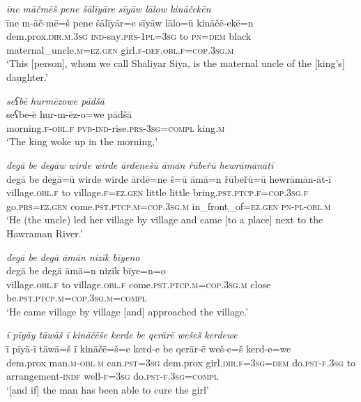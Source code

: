 \ea \label{ZP.36}
\textit{īne māčmēš pene šālīyāre sīyāw lālow kināčekēn} \\ 
\gll īne m-āč-mē=š pene šālīyār=e sīyāw lālo=ū kināčē-ekē=n \\ 
 dem.prox\textsc{.dir}\textsc{.m}\textsc{.3sg} \textsc{ind-}say\textsc{.prs}\textsc{-1pl}\textsc{=3sg} to \textsc{pn}\textsc{=dem} black maternal\_uncle\textsc{.m}\textsc{\textsc{=ez.gen}} girl\textsc{.f}\textsc{-def}\textsc{.obl}\textsc{.f}\textsc{=cop}\textsc{.3sg}\textsc{.m} \\ 
\glt `This [person], whom we call Shaliyar Siya, is the maternal uncle of the [king’s] daughter.'
\z 
 
\ea \label{ZP.37}
\textit{seʕbē hurmēzowe pādšā} \\ 
\gll seʕbe-ē hur-m-ēz-o=we pādšā \\ 
 morning\textsc{.f}\textsc{-obl}\textsc{.f} \textsc{pvb-}\textsc{ind-}rise\textsc{.prs}\textsc{-3sg}\textsc{=compl} king\textsc{.m} \\ 
\glt `The king woke up in the morning,'
\z 
 
\ea \label{ZP.41}
\textit{degā be degāw wirde wirde ārdēnešū āmān řūbeřū hewrāmānātī} \\ 
\gll degā be degā=ū wirde wirde ārdē=ne š=ū āmā=n řūbeřū=ū hewrāmān-āt-ī \\ 
 village\textsc{.obl}\textsc{.f} to village\textsc{.f}\textsc{\textsc{=ez.gen}} little little bring\textsc{.pst}\textsc{.ptcp}\textsc{.f}\textsc{=cop}\textsc{.3sg}\textsc{.f} go\textsc{.prs}\textsc{\textsc{=ez.gen}} come\textsc{.pst}\textsc{.ptcp}\textsc{.m}\textsc{=cop}\textsc{.3sg}\textsc{.m} in\_front\_of\textsc{\textsc{=ez.gen}} \textsc{pn}\textsc{\textsc{-pl}}\textsc{-obl}\textsc{.m} \\ 
\glt `He (the uncle) led her village by village and came [to a place] next to the Hawraman River.'
\z 
 
\ea \label{ZP.42}
\textit{degā be degā āmān nizīk bīyeno} \\ 
\gll degā be degā āmā=n nizīk bīye=n=o \\ 
 village\textsc{.obl}\textsc{.f} to village\textsc{.obl}\textsc{.f} come\textsc{.pst}\textsc{.ptcp}\textsc{.m}\textsc{=cop}\textsc{.3sg}\textsc{.m} close be\textsc{.pst}\textsc{.ptcp}\textsc{.m}\textsc{=cop}\textsc{.3sg}\textsc{.m}\textsc{=compl} \\ 
\glt `He came village by village [and] approached the village.'
\z 
 
\ea \label{ZP.45}
\textit{ī pīyāy tāwāš ī kināčēše kerde be qerārē wešeš kerdewe} \\ 
\gll ī pīyā-ī tāwā=š ī kināčē=š=e kerd-e be qerār-ē weš-e=š kerd-e=we \\ 
 dem.prox man\textsc{.m}\textsc{-obl}\textsc{.m} can\textsc{.pst}\textsc{=3sg} dem.prox girl\textsc{.dir}\textsc{.f}\textsc{=3sg}\textsc{=dem} do\textsc{.pst}\textsc{-f}\textsc{.3sg} to arrangement\textsc{-indf} well\textsc{-f}\textsc{=3sg} do\textsc{.pst}\textsc{-f}\textsc{.3sg}\textsc{=compl} \\ 
\glt `[and if] the man has been able to cure the girl'
\z 
 
